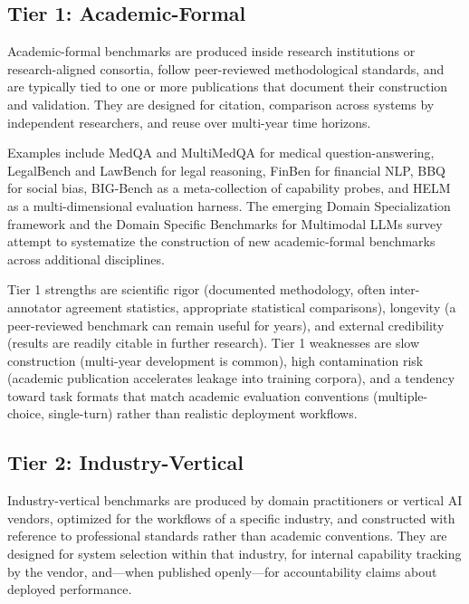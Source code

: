 \documentclass[11pt,a4paper]{article}
\begin{document}
\subsection{Tier 1: Academic-Formal}
\label{sec:tier1}

Academic-formal benchmarks are produced inside research institutions or research-aligned consortia, follow peer-reviewed methodological standards, and are typically tied to one or more publications that document their construction and validation. They are designed for citation, comparison across systems by independent researchers, and reuse over multi-year time horizons.

Examples include MedQA \citep{jin2021disease} and MultiMedQA \citep{singhal2023large} for medical question-answering, LegalBench \citep{guha2024legalbench} and LawBench \citep{fei2023lawbench} for legal reasoning, FinBen \citep{xie2024finben} for financial NLP, BBQ \citep{parrish2022bbq} for social bias, BIG-Bench \citep{srivastava2023bigbench} as a meta-collection of capability probes, and HELM \citep{liang2023holistic} as a multi-dimensional evaluation harness. The emerging Domain Specialization framework \citep{ling2024domain} and the Domain Specific Benchmarks for Multimodal LLMs survey \citep{he2025domainmllm} attempt to systematize the construction of new academic-formal benchmarks across additional disciplines.

Tier 1 strengths are scientific rigor (documented methodology, often inter-annotator agreement statistics, appropriate statistical comparisons), longevity (a peer-reviewed benchmark can remain useful for years), and external credibility (results are readily citable in further research). Tier 1 weaknesses are slow construction (multi-year development is common), high contamination risk (academic publication accelerates leakage into training corpora), and a tendency toward task formats that match academic evaluation conventions (multiple-choice, single-turn) rather than realistic deployment workflows.

\subsection{Tier 2: Industry-Vertical}
\label{sec:tier2}

Industry-vertical benchmarks are produced by domain practitioners or vertical AI vendors, optimized for the workflows of a specific industry, and constructed with reference to professional standards rather than academic conventions. They are designed for system selection within that industry, for internal capability tracking by the vendor, and---when published openly---for accountability claims about deployed performance.
\end{document}

